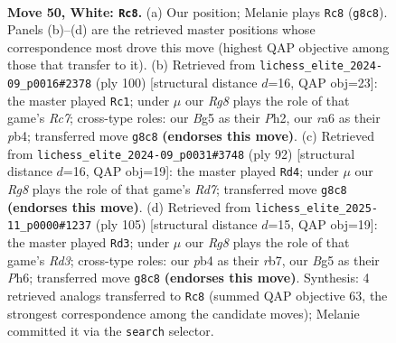 \documentclass[11pt]{article}
\begin{document}
\clearpage

\begin{figure}[p]\centering
\begin{subfigure}{0.46\textwidth}\centering
\resizebox{\linewidth}{!}{%
\newchessgame
\chessboard[
  setfen={6R1/5k1r/rp6/6B1/1p1P4/3K4/8/8 w - - 3 50},
  showmover=false,
  pgfstyle=straightmove, color=movearrow, markmove={g8-c8}
]}
\caption{}
\end{subfigure}\hfill
\begin{subfigure}{0.46\textwidth}\centering
\resizebox{\linewidth}{!}{%
\newchessgame
\chessboard[
  setfen={8/2R5/1r1k2p1/5p2/1p6/4K3/6PP/8 w - - 4 51},
  showmover=false,
  pgfstyle=straightmove, color=movearrow, markmove={c7-c1}
]}
\caption{}
\end{subfigure}
\\[4pt]
\begin{subfigure}{0.46\textwidth}\centering
\resizebox{\linewidth}{!}{%
\newchessgame
\chessboard[
  setfen={4k3/3R4/5K2/p7/8/P1p4r/2B5/8 w - - 4 47},
  showmover=false,
  pgfstyle=straightmove, color=movearrow, markmove={d7-d4}
]}
\caption{}
\end{subfigure}\hfill
\begin{subfigure}{0.46\textwidth}\centering
\resizebox{\linewidth}{!}{%
\newchessgame
\chessboard[
  setfen={5k2/1R6/3r3p/1P2K3/p6P/8/8/8 b - - 5 53},
  showmover=false,
  pgfstyle=straightmove, color=movearrow, markmove={d6-d3}
]}
\caption{}
\end{subfigure}
\caption{\textbf{Move 50, White: \texttt{Rc8}.} (a) Our position; Melanie plays \texttt{Rc8} (\texttt{g8c8}). Panels (b)--(d) are the retrieved master positions whose correspondence most drove this move (highest QAP objective among those that transfer to it). (b) Retrieved from \texttt{lichess\_elite\_2024-09\_p0016\#2378} (ply 100) [structural distance $d$=16, QAP obj=23]: the master played \texttt{Rc1}; under $\mu$ our \emph{Rg8} plays the role of that game's \emph{Rc7}; cross-type roles: our \emph{B}g5 as their \emph{P}h2, our \emph{r}a6 as their \emph{p}b4; transferred move \texttt{g8c8} \textbf{(endorses this move)}. (c) Retrieved from \texttt{lichess\_elite\_2024-09\_p0031\#3748} (ply 92) [structural distance $d$=16, QAP obj=19]: the master played \texttt{Rd4}; under $\mu$ our \emph{Rg8} plays the role of that game's \emph{Rd7}; transferred move \texttt{g8c8} \textbf{(endorses this move)}. (d) Retrieved from \texttt{lichess\_elite\_2025-11\_p0000\#1237} (ply 105) [structural distance $d$=15, QAP obj=19]: the master played \texttt{Rd3}; under $\mu$ our \emph{Rg8} plays the role of that game's \emph{Rd3}; cross-type roles: our \emph{p}b4 as their \emph{r}b7, our \emph{B}g5 as their \emph{P}h6; transferred move \texttt{g8c8} \textbf{(endorses this move)}. Synthesis: 4 retrieved analogs transferred to \texttt{Rc8} (summed QAP objective 63, the strongest correspondence among the candidate moves); Melanie committed it via the \texttt{search} selector.}
\label{fig:thought-m98}
\end{figure}
\end{document}
